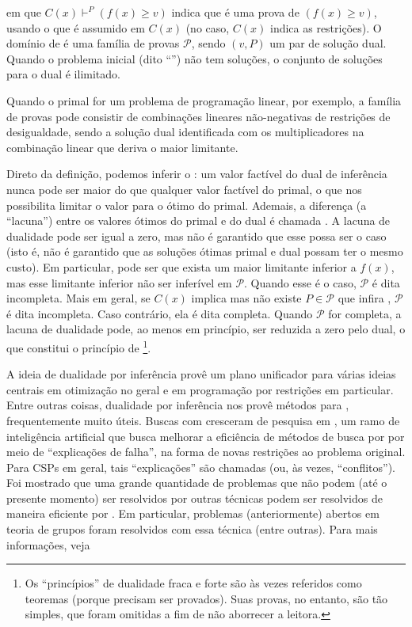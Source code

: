 \noindent em que $C(x) \vdash^{P} (f(x) \geq v)$ indica que  é
uma prova de $(f(x) \geq v)$, usando o que é assumido em $C(x)$ (no
caso, $C(x)$ indica as restrições). O domínio de  é uma família
de provas $\mathcal{P}$, sendo $(v,P)$ um par de solução dual. Quando
o problema inicial (dito ``'') não tem soluções, o
conjunto de soluções para o dual é ilimitado.

Quando o primal for um problema de programação linear, por exemplo, a
família de provas pode consistir de combinações lineares não-negativas
de restrições de desigualdade, sendo a solução dual identificada com
os multiplicadores na combinação linear que deriva o maior limitante.

Direto da definição, podemos inferir o : um valor factível  do dual de inferência
nunca pode ser maior do que qualquer valor factível do primal, o que
nos possibilita limitar o valor para o ótimo do primal.  Ademais, a
diferença (a ``lacuna'') entre os valores ótimos do primal e do dual é
chamada . A lacuna de dualidade pode
ser igual a zero, mas não é garantido que esse possa ser o caso (isto
é, não é garantido que as soluções ótimas primal e dual possam ter o
mesmo custo). Em particular, pode ser que exista um maior limitante
inferior a $f(x)$, mas esse limitante inferior não ser inferível em
$\mathcal{P}$. Quando esse é o caso, $\mathcal{P}$ é dita
incompleta. Mais em geral, se $C(x)$ implica  mas não existe $P
\in \mathcal{P}$ que infira , $\mathcal{P}$ é dita
incompleta. Caso contrário, ela é dita completa. Quando $\mathcal{P}$
for completa, a lacuna de dualidade pode, ao menos em princípio, ser
reduzida a zero pelo dual, o que constitui o princípio de
\footnote{Os ``princípios'' de dualidade
  fraca e forte são às vezes referidos como teoremas (porque precisam
  ser provados). Suas provas, no entanto, são tão simples, que foram
  omitidas a fim de não aborrecer a leitora.}.

A ideia de dualidade por inferência provê um plano unificador para
várias ideias centrais em otimização no geral e em programação por
restrições em particular. Entre outras coisas, dualidade por
inferência nos provê métodos para , frequentemente muito úteis. Buscas com
 cresceram de pesquisa em
, um ramo de
inteligência artificial que busca melhorar a eficiência de métodos de
busca por  por meio de ``explicações de
falha'', na forma de novas restrições ao problema original. Para CSPs
em geral, tais ``explicações'' são chamadas  (ou, às
vezes, ``conflitos''). Foi mostrado que uma grande quantidade de
problemas que não podem (até o presente momento) ser resolvidos por
outras técnicas podem ser resolvidos de maneira eficiente por
. Em particular, problemas
(anteriormente) abertos em teoria de grupos foram resolvidos com essa
técnica (entre outras). Para mais informações, veja~\cite{beame}

